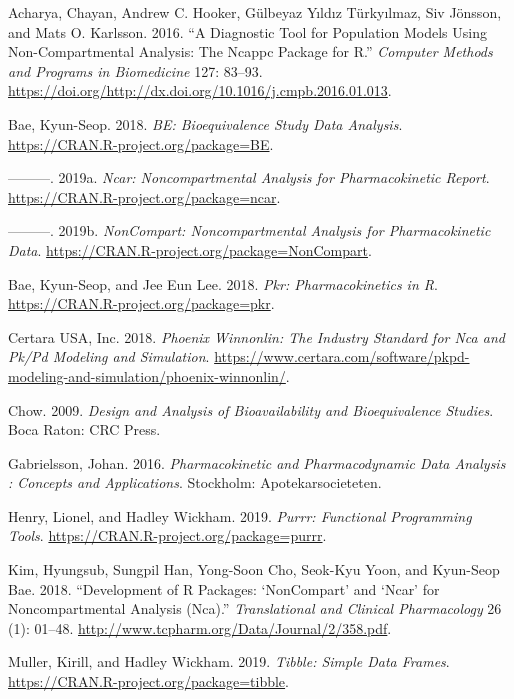 \documentclass[12pt,]{krantz}
\begin{document}
\hypertarget{refs}{}
\leavevmode\hypertarget{ref-Acharya201683}{}%
Acharya, Chayan, Andrew C. Hooker, Gülbeyaz Yıldız Türkyılmaz, Siv Jönsson, and Mats O. Karlsson. 2016. ``A Diagnostic Tool for Population Models Using Non-Compartmental Analysis: The Ncappc Package for R.'' \emph{Computer Methods and Programs in Biomedicine} 127: 83--93. \url{https://doi.org/http://dx.doi.org/10.1016/j.cmpb.2016.01.013}.

\leavevmode\hypertarget{ref-R-BE}{}%
Bae, Kyun-Seop. 2018. \emph{BE: Bioequivalence Study Data Analysis}. \url{https://CRAN.R-project.org/package=BE}.

\leavevmode\hypertarget{ref-R-ncar}{}%
---------. 2019a. \emph{Ncar: Noncompartmental Analysis for Pharmacokinetic Report}. \url{https://CRAN.R-project.org/package=ncar}.

\leavevmode\hypertarget{ref-R-NonCompart}{}%
---------. 2019b. \emph{NonCompart: Noncompartmental Analysis for Pharmacokinetic Data}. \url{https://CRAN.R-project.org/package=NonCompart}.

\leavevmode\hypertarget{ref-R-pkr}{}%
Bae, Kyun-Seop, and Jee Eun Lee. 2018. \emph{Pkr: Pharmacokinetics in R}. \url{https://CRAN.R-project.org/package=pkr}.

\leavevmode\hypertarget{ref-wnl}{}%
Certara USA, Inc. 2018. \emph{Phoenix Winnonlin: The Industry Standard for Nca and Pk/Pd Modeling and Simulation}. \url{https://www.certara.com/software/pkpd-modeling-and-simulation/phoenix-winnonlin/}.

\leavevmode\hypertarget{ref-chow2009design}{}%
Chow. 2009. \emph{Design and Analysis of Bioavailability and Bioequivalence Studies}. Boca Raton: CRC Press.

\leavevmode\hypertarget{ref-gab}{}%
Gabrielsson, Johan. 2016. \emph{Pharmacokinetic and Pharmacodynamic Data Analysis : Concepts and Applications}. Stockholm: Apotekarsocieteten.

\leavevmode\hypertarget{ref-R-purrr}{}%
Henry, Lionel, and Hadley Wickham. 2019. \emph{Purrr: Functional Programming Tools}. \url{https://CRAN.R-project.org/package=purrr}.

\leavevmode\hypertarget{ref-Kim_2018}{}%
Kim, Hyungsub, Sungpil Han, Yong-Soon Cho, Seok-Kyu Yoon, and Kyun-Seop Bae. 2018. ``Development of R Packages: `NonCompart' and `Ncar' for Noncompartmental Analysis (Nca).'' \emph{Translational and Clinical Pharmacology} 26 (1): 01--48. \url{http://www.tcpharm.org/Data/Journal/2/358.pdf}.

\leavevmode\hypertarget{ref-R-tibble}{}%
Muller, Kirill, and Hadley Wickham. 2019. \emph{Tibble: Simple Data Frames}. \url{https://CRAN.R-project.org/package=tibble}.
\end{document}

